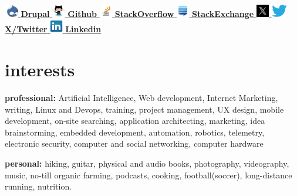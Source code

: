 \documentclass[]{friggeri-cv} %
\begin{document}
	
    \href{http://drupal.org/user/34622}{\includegraphics[height=16pt]{druplicon.png}  \textbf{Drupal }} \href{https://github.com/frazras}{\includegraphics[height=16pt]{octocat.png}  \textbf{Github }}
    \href{http://stackoverflow.com/users/1106420/frazras}{\includegraphics[height=16pt]{stackoverflow.png}  \textbf{StackOverflow }}
    \href{http://stackexchange.com/users/530574/frazras?tab=accounts}{\includegraphics[height=16pt]{stackexchange.png}  \textbf{StackExchange }}
    \href{http://twitter.com/frazras}{\includegraphics[height=16pt]{x.png} \includegraphics[height=16pt]{twitter.eps}  \textbf{X/Twitter }}
    \href{http://jm.linkedin.com/in/rohansmith}{\includegraphics[height=16pt]{linkedin.png}  \textbf{Linkedin }}


\section{interests}

\textbf{professional:} Artificial Intelligence, Web development, Internet Marketing, writing, Linux and Devops, training, project management, UX design, mobile development, on-site searching, application architecting, marketing, idea brainstorming, embedded development, automation, robotics, telemetry, electronic security, computer and social networking, computer hardware

\textbf{personal:} hiking, guitar, physical and audio books, photography, videography, music, no-till organic farming, podcasts, cooking, football(soccer), long-distance running, nutrition.
\end{document}
